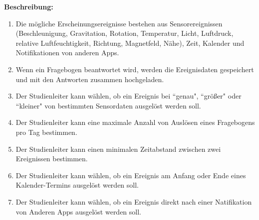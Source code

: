 \documentclass[a4paper]{scrreprt}
\begin{document}
\begin{itemize}
                \par \textbf{Beschreibung: }
                    \begin{enumerate}
                        \item Die mögliche Erscheinungsereignisse bestehen aus Sensorereignissen (Beschleunigung, Gravitation, Rotation, Temperatur, Licht, Luftdruck, relative Luftfeuchtigkeit, Richtung, Magnetfeld, Nähe), Zeit, Kalender und Notifikationen von anderen Apps.
                        \item Wenn ein Fragebogen beantwortet wird, werden die Ereignisdaten gespeichert und mit den Antworten zusammen hochgeladen.
                        \item Der \gls{Studienleiter} kann wählen, ob ein Ereignis bei ``genau", ``größer" oder ``kleiner" von bestimmten Sensordaten ausgelöst werden soll.
                        \item Der \gls{Studienleiter} kann eine maximale Anzahl von Auslösen eines Fragebogens pro Tag bestimmen.
                        \item Der \gls{Studienleiter} kann einen minimalen Zeitabstand zwischen zwei Ereignissen bestimmen.
                        \item  Der \gls{Studienleiter} kann wählen, ob ein Ereignis am Anfang oder Ende eines Kalender-Termins ausgelöst werden soll.
                        \item  Der \gls{Studienleiter} kann wählen, ob ein Ereignis direkt nach einer Natifikation von Anderen Apps ausgelöst werden soll.
                    \end{enumerate}
                

\end{itemize}
\end{document}
